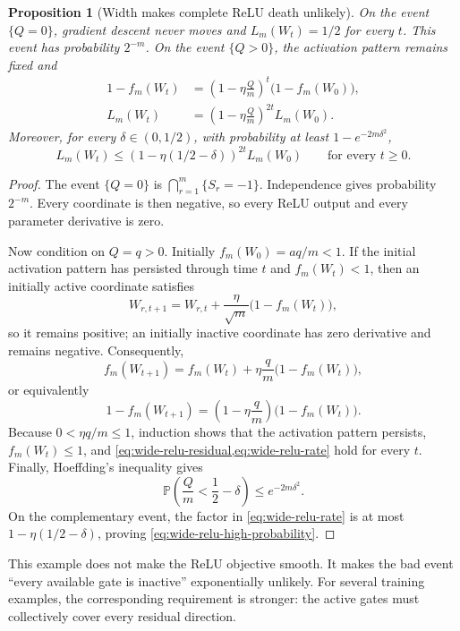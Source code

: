 \documentclass[11pt,twoside]{article}
\renewcommand{\P}{\mathbb P}
\newtheorem{proposition}[theorem]{Proposition}
\theoremstyle{definition}
\theoremstyle{remark}
\begin{document}
\begin{proposition}[Width makes complete ReLU death unlikely]
\label{prop:wide-relu-scalar}
On the event $\{Q=0\}$, gradient descent never moves and
$L_m(W_t)=1/2$ for every $t$. This event has probability $2^{-m}$.
On the event $\{Q>0\}$, the activation pattern remains fixed and
\begin{align}
 1-f_m(W_t)
 &=\left(1-\eta\frac Qm\right)^t
      \bigl(1-f_m(W_0)\bigr),
 \label{eq:wide-relu-residual}\\
 L_m(W_t)
 &=\left(1-\eta\frac Qm\right)^{2t}L_m(W_0).
 \label{eq:wide-relu-rate}
\end{align}
Moreover, for every $\delta\in(0,1/2)$, with probability at least
$1-e^{-2m\delta^2}$,
\begin{equation}
 L_m(W_t)
 \le\left(1-\eta(1/2-\delta)\right)^{2t}L_m(W_0)
 \qquad\text{for every }t\ge0.
 \label{eq:wide-relu-high-probability}
\end{equation}
\end{proposition}

\begin{proof}
The event $\{Q=0\}$ is
$\bigcap_{r=1}^m\{S_r=-1\}$. Independence gives probability $2^{-m}$.
Every coordinate is then negative, so every ReLU output and every parameter
derivative is zero.

Now condition on $Q=q>0$. Initially
$f_m(W_0)=aq/m<1$. If the initial activation pattern has persisted through
time $t$ and $f_m(W_t)<1$, then an initially active coordinate satisfies
\[
 W_{r,t+1}=W_{r,t}+\frac{\eta}{\sqrt m}
                 \bigl(1-f_m(W_t)\bigr),
\]
so it remains positive; an initially inactive coordinate has zero derivative
and remains negative. Consequently,
\[
 f_m(W_{t+1})
 =f_m(W_t)+\eta\frac qm\bigl(1-f_m(W_t)\bigr),
\]
or equivalently
\[
 1-f_m(W_{t+1})
 =\left(1-\eta\frac qm\right)
    \bigl(1-f_m(W_t)\bigr).
\]
Because $0<\eta q/m\le1$, induction shows that the activation pattern
persists, $f_m(W_t)\le1$, and \cref{eq:wide-relu-residual,eq:wide-relu-rate}
hold for every $t$. Finally, Hoeffding's inequality gives
\[
 \P\left(\frac Qm<\frac12-\delta\right)
 \le e^{-2m\delta^2}.
\]
On the complementary event, the factor in
\cref{eq:wide-relu-rate} is at most
$1-\eta(1/2-\delta)$, proving
\cref{eq:wide-relu-high-probability}.
\end{proof}

This example does not make the ReLU objective smooth. It makes the bad event
``every available gate is inactive'' exponentially unlikely. For several
training examples, the corresponding requirement is stronger: the active
gates must collectively cover every residual direction.
\end{document}
